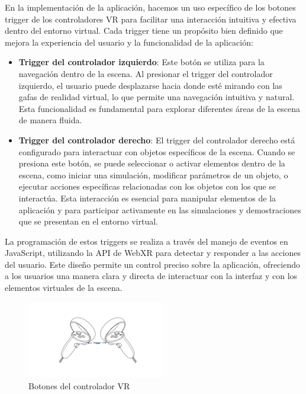 \documentclass[a4paper, 12pt]{book}
\begin{document}
En la implementación de la aplicación, hacemos un uso específico de los botones trigger de los controladores VR para facilitar una interacción 
intuitiva y efectiva dentro del entorno virtual. Cada trigger tiene un propósito bien definido que mejora la experiencia del 
usuario y la funcionalidad de la aplicación:

\begin{itemize}
  \item \textbf{Trigger del controlador izquierdo}: Este botón se utiliza para la navegación dentro de la escena. Al presionar el trigger del controlador izquierdo, 
  el usuario puede desplazarse hacia donde esté mirando con las gafas de realidad virtual, lo que permite una navegación intuitiva y natural. 
  Esta funcionalidad es fundamental para explorar diferentes áreas de la escena de manera fluida.
  
  \item \textbf{Trigger del controlador derecho}: El trigger del controlador derecho está configurado para interactuar con objetos 
  específicos de la escena. Cuando se presiona este botón, se puede seleccionar o activar elementos dentro de la escena, 
  como iniciar una simulación, modificar parámetros de un objeto, o ejecutar acciones específicas relacionadas con los objetos con los que se interactúa. 
  Esta interacción es esencial para manipular elementos de la aplicación y para participar activamente en las simulaciones y demostraciones que se presentan en el entorno virtual.
\end{itemize}

La programación de estos triggers se realiza a través del manejo de eventos en JavaScript, utilizando la API de WebXR para detectar y responder 
a las acciones del usuario. Este diseño permite un control preciso sobre la aplicación, ofreciendo a los usuarios una manera clara y directa 
de interactuar con la interfaz y con los elementos virtuales de la escena.

\begin{figure}
  \centering
  \includegraphics[width=6cm, keepaspectratio]{img/BotonesControlador.png}
  \caption{Botones del controlador VR}
  \label{fig:controladorBotones}
\end{figure}
\end{document}
